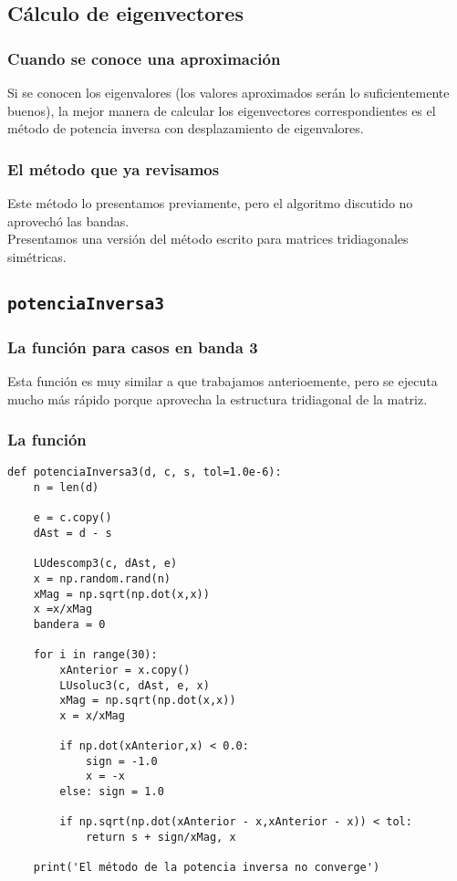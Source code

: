 \documentclass[12pt]{beamer}
\begin{document}
\subsection{Cálculo de eigenvectores}

\begin{frame}
\frametitle{Cuando se conoce una aproximación}
Si se conocen los eigenvalores (los valores aproximados serán lo suficientemente buenos), \pause la mejor manera de calcular los eigenvectores correspondientes es el método de potencia inversa con desplazamiento de eigenvalores.
\end{frame}
\begin{frame}
\frametitle{El método que ya revisamos}
Este método lo presentamos previamente, pero el algoritmo discutido no aprovechó las bandas.
\\
\bigskip
\pause
Presentamos una versión del método escrito para matrices tridiagonales simétricas.
\end{frame}

\subsection{\texttt{potenciaInversa3}}

\begin{frame}
\frametitle{La función para casos en banda 3}
Esta función  es muy similar a  que trabajamos anterioemente, pero se ejecuta mucho más rápido porque aprovecha la estructura tridiagonal de la matriz.
\end{frame}
\begin{frame}
\frametitle{La función}
\begin{lstlisting}[caption=Código para el cálculo de eigenvectores en 3 banda]
def potenciaInversa3(d, c, s, tol=1.0e-6):
    n = len(d)
    
    e = c.copy()
    dAst = d - s
    
    LUdescomp3(c, dAst, e)
    x = np.random.rand(n)
    xMag = np.sqrt(np.dot(x,x))
    x =x/xMag
    bandera = 0
    
    for i in range(30):
        xAnterior = x.copy()
        LUsoluc3(c, dAst, e, x)
        xMag = np.sqrt(np.dot(x,x))
        x = x/xMag
        
        if np.dot(xAnterior,x) < 0.0:
            sign = -1.0
            x = -x
        else: sign = 1.0
        
        if np.sqrt(np.dot(xAnterior - x,xAnterior - x)) < tol:
            return s + sign/xMag, x
    
    print('El método de la potencia inversa no converge')
\end{lstlisting}
\end{frame}
\end{document}
